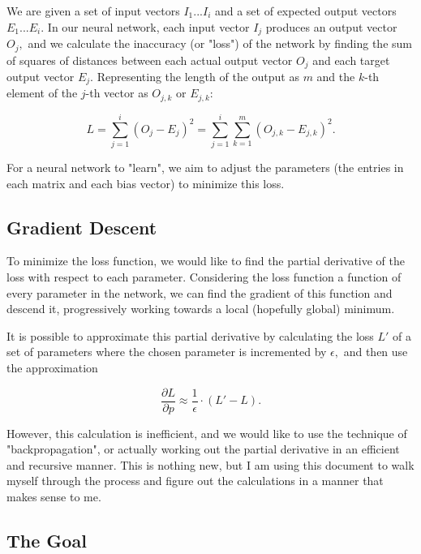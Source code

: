 \documentclass{article}
\begin{document}
We are given a set of input vectors $I_1 ... I_i$ and a set of expected output vectors $E_1 ... E_i.$ In our neural network, each input vector $I_j$ produces an output vector $O_j,$ and we calculate the inaccuracy (or "loss") of the network by finding the sum of squares of distances between each actual output vector $O_j$ and each target output vector $E_j.$ Representing the length of the output as $m$ and the $k$-th element of the $j$-th vector as $O_{j,k}$ or $E_{j,k}:$

\begin{equation}
\label{loss}
L = \sum_{j=1}^i (O_j - E_j)^2 = \sum_{j=1}^i \sum_{k=1}^m (O_{j,k} - E_{j,k})^2.
\end{equation}

For a neural network to "learn", we aim to adjust the parameters (the entries in each matrix and each bias vector) to minimize this loss.

\subsection{Gradient Descent}

To minimize the loss function, we would like to find the partial derivative of the loss with respect to each parameter. Considering the loss function a function of every parameter in the network, we can find the gradient of this function and descend it, progressively working towards a local (hopefully global) minimum.

It is possible to approximate this partial derivative by calculating the loss $L'$ of a set of parameters where the chosen parameter is incremented by $\epsilon,$ and then use the approximation

\begin{equation}
\label{epsapprox}
\frac{\partial L}{\partial p} \approx \frac 1 \epsilon \cdot (L' - L).
\end{equation}

However, this calculation is inefficient, and we would like to use the technique of "backpropagation", or actually working out the partial derivative in an efficient and recursive manner. This is nothing new, but I am using this document to walk myself through the process and figure out the calculations in a manner that makes sense to me.

\subsection{The Goal}
\end{document}
